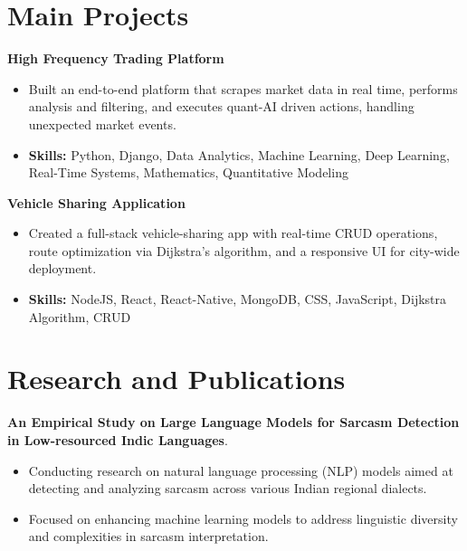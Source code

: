 \documentclass[a4paper,11pt]{article}
\begin{document}
\section{\textbf{Main Projects}}

\vspace{1mm}
  \textbf{High Frequency Trading Platform  }
\vspace{-1.5mm} %
\begin{itemize}
  \item Built an end-to-end platform that scrapes market data in real time, performs analysis and filtering, and executes quant-AI driven actions, handling unexpected market events.
\vspace{-3mm}
  \item \textbf{Skills:} Python, Django, Data Analytics, Machine Learning, Deep Learning, Real-Time Systems, Mathematics, Quantitative Modeling
\end{itemize}


\vspace{1mm}
   \textbf{Vehicle Sharing Application }
\vspace{-1.5mm} %
\begin{itemize}
  \item Created a full-stack vehicle-sharing app with real-time CRUD operations, route optimization via Dijkstra's algorithm, and a responsive UI for city-wide deployment.
\vspace{-3mm}
  \item \textbf{Skills:} NodeJS, React, React-Native, MongoDB, CSS, JavaScript, Dijkstra Algorithm, CRUD
\end{itemize}



\section{\textbf{Research and Publications} \hfill }
\vspace{1mm}
  \textbf{An Empirical Study on Large Language Models for Sarcasm Detection in Low-resourced Indic Languages}.
\vspace{-1mm} %
\begin{itemize}
  \item Conducting research on natural language processing (NLP) models aimed at detecting and analyzing sarcasm across various Indian regional dialects.
\vspace{-3mm}
  \item Focused on enhancing machine learning models to address linguistic diversity and complexities in sarcasm interpretation.
\end{itemize}
\end{document}
